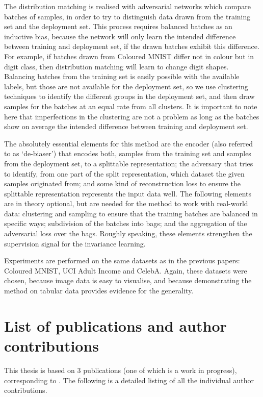 The distribution matching is realised with adversarial networks which compare batches of samples,
in order to try to distinguish data drawn from the training set and the deployment set.
This process requires balanced batches as an inductive bias,
because the network will only learn the intended difference between training and deployment set,
if the drawn batches exhibit this difference.
For example, if batches drawn from Coloured MNIST differ not in colour but in digit class,
then distribution matching will learn to change digit shapes.
Balancing batches from the training set is easily possible with the available labels,
but those are not available for the deployment set,
so we use clustering techniques to identify the different groups in the deployment set,
and then draw samples for the batches at an equal rate from all clusters.
It is important to note here that imperfections in the clustering are not a problem
as long as the batches show on average the intended difference between training and deployment set.

The absolutely essential elements for this method are the encoder (also referred to as `de-biaser')
that encodes both, samples from the training set and samples from the deployment set,
to a splittable representation;
the adversary that tries to identify, from one part of the split representation,
which dataset the given samples originated from;
and some kind of reconstruction loss
to ensure the splittable representation represents the input data well.
The following elements are in theory optional,
but are needed for the method to work with real-world data:
clustering and sampling to ensure that the training batches are balanced in specific ways;
subdivision of the batches into bags; and the aggregation of the adversarial loss over the bags.
Roughly speaking, these elements strengthen the supervision signal for the invariance learning.

Experiments are performed on the same datasets as in the previous papers:
Coloured MNIST, UCI Adult Income and CelebA.
Again, these datasets were chosen, because image data is easy to visualise,
and because demonstrating the method on tabular data provides evidence for the generality.

\section{List of publications and author contributions}%
\label{sec:claims-contributions}
This thesis is based on 3 publications (one of which is a work in progress),
corresponding to .
The following is a detailed listing of all the individual author contributions.

